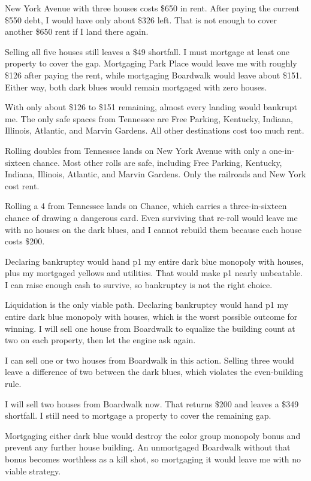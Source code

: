 {New York Avenue with three houses costs \$650 in rent. After paying the current \$550 debt, I would have only about \$326 left. That is not enough to cover another \$650 rent if I land there again.
\par
Selling all five houses still leaves a \$49 shortfall. I must mortgage at least one property to cover the gap. Mortgaging Park Place would leave me with roughly \$126 after paying the rent, while mortgaging Boardwalk would leave about \$151. Either way, both dark blues would remain mortgaged with zero houses.
\par
With only about \$126 to \$151 remaining, almost every landing would bankrupt me. The only safe spaces from Tennessee are Free Parking, Kentucky, Indiana, Illinois, Atlantic, and Marvin Gardens. All other destinations cost too much rent.
\par
Rolling doubles from Tennessee lands on New York Avenue with only a one-in-sixteen chance. Most other rolls are safe, including Free Parking, Kentucky, Indiana, Illinois, Atlantic, and Marvin Gardens. Only the railroads and New York cost rent.
\par
Rolling a 4 from Tennessee lands on Chance, which carries a three-in-sixteen chance of drawing a dangerous card. Even surviving that re-roll would leave me with no houses on the dark blues, and I cannot rebuild them because each house costs \$200.
\par
Declaring bankruptcy would hand p1 my entire dark blue monopoly with houses, plus my mortgaged yellows and utilities. That would make p1 nearly unbeatable. I can raise enough cash to survive, so bankruptcy is not the right choice.
\par
Liquidation is the only viable path. Declaring bankruptcy would hand p1 my entire dark blue monopoly with houses, which is the worst possible outcome for winning. I will sell one house from Boardwalk to equalize the building count at two on each property, then let the engine ask again.
\par
I can sell one or two houses from Boardwalk in this action. Selling three would leave a difference of two between the dark blues, which violates the even-building rule.
\par
I will sell two houses from Boardwalk now. That returns \$200 and leaves a \$349 shortfall. I still need to mortgage a property to cover the remaining gap.
\par
Mortgaging either dark blue would destroy the color group monopoly bonus and prevent any further house building. An unmortgaged Boardwalk without that bonus becomes worthless as a kill shot, so mortgaging it would leave me with no viable strategy.
}
